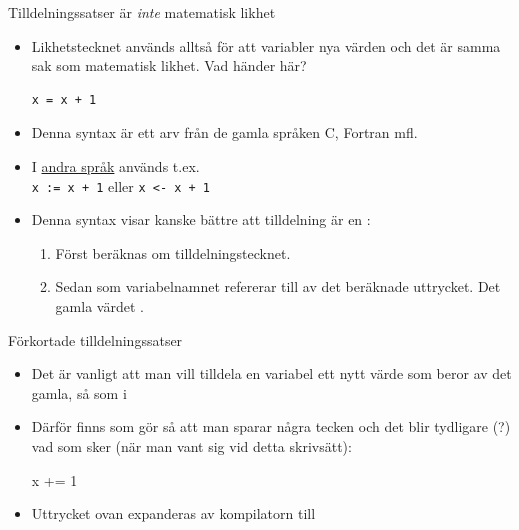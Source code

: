 \begin{Slide}{Tilldelningssatser är \emph{inte} matematisk likhet}\SlideFontSmall

\begin{itemize}

\item Likhetstecknet används alltså för att  variabler nya värden och det är  samma sak som matematisk likhet. Vad händer här?
\begin{lstlisting}
x = x + 1
\end{lstlisting}

\item Denna syntax är ett arv från de gamla språken C, Fortran mfl.

\item I \href{https://en.wikipedia.org/wiki/Assignment_(computer_science)}{andra språk} används  t.ex.  \\\vspace{1em}
\texttt{x := x + 1}  \hspace{2em} eller  \hspace{2em} \texttt{x <- x + 1} \\\vspace{0.5em}

\item Denna syntax visar kanske bättre att tilldelning är en :

\begin{enumerate}\SlideFontTiny
\item Först beräknas  om tilldelningstecknet.
\item Sedan  som variabelnamnet refererar till av det beräknade uttrycket. Det gamla värdet .
\end{enumerate}

\end{itemize}

\end{Slide}


\begin{Slide}{Förkortade tilldelningssatser}
\begin{itemize}
\item Det är vanligt att man vill tilldela en variabel ett nytt värde som beror av det gamla, så som i \\

\item Därför finns  som gör så att man sparar några tecken och det blir tydligare (?) vad som sker (när man vant sig vid detta skrivsätt):
\begin{Code}
x += 1
\end{Code}

\item Uttrycket ovan expanderas av kompilatorn till 
\end{itemize}


\end{Slide}


